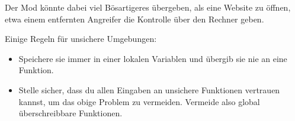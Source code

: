 Der Mod könnte dabei viel Bösartigeres übergeben, als eine Website zu
öffnen, etwa einem entfernten Angreifer die Kontrolle über den Rechner
geben.

Einige Regeln für unsichere Umgebungen:

\begin{itemize}
\tightlist
\item
  Speichere sie immer in einer lokalen Variablen und übergib sie nie an
  eine Funktion.
\item
  Stelle sicher, dass du allen Eingaben an unsichere Funktionen
  vertrauen kannst, um das obige Problem zu vermeiden. Vermeide also
  global überschreibbare Funktionen.
\end{itemize}
